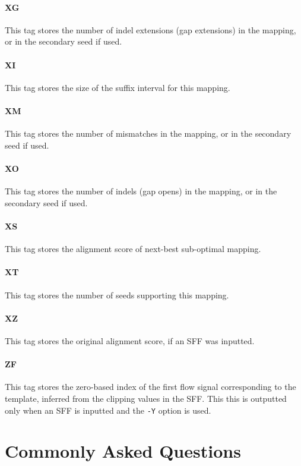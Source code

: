 \documentclass[a4paper,12pt]{book}
\newcommand{\TT}[1]{{\tt #1}} %
\begin{document}
\subsubsection{XG}
This tag stores the number of indel extensions (gap extensions) in the mapping, or in the secondary seed if used.

\subsubsection{XI}
This tag stores the size of the suffix interval for this mapping.

\subsubsection{XM}
This tag stores the number of mismatches in the mapping, or in the secondary seed if used.

\subsubsection{XO}
This tag stores the number of indels (gap opens) in the mapping, or in the secondary seed if used.

\subsubsection{XS}
This tag stores the alignment score of next-best sub-optimal mapping.

\subsubsection{XT}
This tag stores the number of seeds supporting this mapping.
\subsubsection{XZ}
This tag stores the original alignment score, if an SFF was inputted.


\subsubsection{ZF}
This tag stores the zero-based index of the first flow signal corresponding to the template, inferred from the clipping values in the SFF.
This this is outputted only when an SFF is inputted and the \TT{-Y} option is used.

\chapter{Commonly Asked Questions}
\label{chap:faq}
\end{document}
